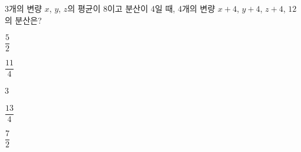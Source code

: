 3개의 변량 $x$, $y$, $z$의 평균이 8이고 분산이 4일 때, 4개의 변량 $x+4$, $y+4$, $z+4$, $12$의 분산은?
\begin{choices32}{\rule[-3ex]{0pt}{8ex}$\dfrac{5}{2}$}{\rule[-3ex]{0pt}{8ex}$\dfrac{11}{4}$}{\rule[-3ex]{0pt}{8ex}$3$}{\rule[-3ex]{0pt}{8ex}$\dfrac{13}{4}$}{\rule[-3ex]{0pt}{8ex}$\dfrac{7}{2}$}\end{choices32}
